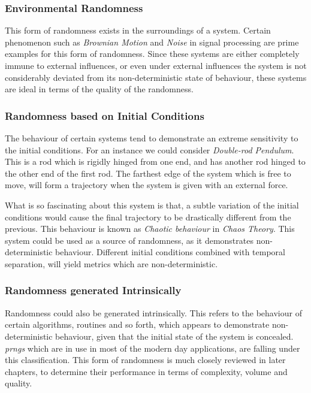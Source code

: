 \begin{sectionlist}
\subsubsection{Environmental Randomness}

This form of randomness exists in the surroundings of a system. Certain phenomenon such as \textit{Brownian Motion} and \textit{Noise} in signal processing are prime examples for this form of randomness. Since these systems are either completely immune to external influences, or even under external influences the system is not considerably deviated from its non-deterministic  state of behaviour, these systems are ideal in terms of the quality of the randomness.

\subsubsection{Randomness based on Initial Conditions}

The behaviour of certain systems tend to demonstrate an extreme sensitivity to the initial conditions. For an instance we could consider \textit{Double-rod Pendulum}. This is a rod which is rigidly hinged from one end, and has another rod hinged to the other end of the first rod. The farthest edge of the system which is free to move, will form a trajectory when the system is given with an external force.

What is so fascinating about this system is that, a subtle variation of the initial conditions would cause the final trajectory to be drastically different from the previous. This behaviour is known as \textit{Chaotic behaviour} in \textit{Chaos Theory}. This system could be used as a source of randomness, as it demonstrates non-deterministic behaviour. Different initial conditions combined with temporal separation, will yield metrics which are non-deterministic. 

\subsubsection{Randomness generated Intrinsically}

Randomness could also be generated intrinsically. This refers to the behaviour of certain algorithms, routines and so forth, which appears to demonstrate non-deterministic behaviour, given that the initial state of the system is concealed. \textit{\acrfull{prng}s} which are in use in most of the modern day applications, are falling under this classification. This form of randomness is much closely reviewed in later chapters, to determine their performance in terms of complexity, volume and quality. 

\end{sectionlist}

